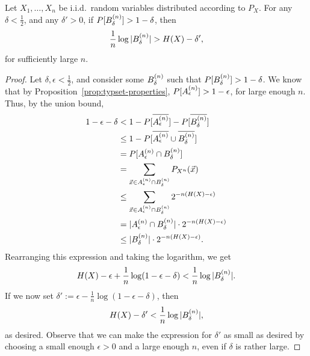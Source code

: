 \begin{theorem}
Let $X_1, \ldots, X_n$ be i.i.d.\ random variables distributed according to $P_X$. For any $\delta < \frac{1}{2}$, and any $\delta' > 0$, if $P[B_{\delta}^{(n)}] > 1 - \delta$, then
\[
\frac{1}{n} \log |B_{\delta}^{(n)}| > H(X) - \delta',
\]
for sufficiently large $n$.
\end{theorem}
\begin{proof}
Let $\delta,\epsilon < \frac{1}{2}$, and consider some $B_{\delta}^{(n)}$ such that $P[B_{\delta}^{(n)}] > 1 - \delta$. We know that by Proposition~\ref{prop:typset-properties}, $P[A_{\epsilon}^{(n)}] > 1 - \epsilon$, for large enough $n$. Thus, by the union bound,
\begin{align}
1 - \epsilon - \delta &< 1 - P[\overline{A_{\epsilon}^{(n)}}] - P[\overline{B_{\delta}^{(n)}}]\nonumber\\
&\leq 1-P[\overline{A_{\epsilon}^{(n)}} \cup \overline{B_{\delta}^{(n)}}]\nonumber\\
&= P[A_{\epsilon}^{(n)} \cap B_{\delta}^{(n)}]\nonumber\\
&= \sum_{\vec{x} \in A_{\epsilon}^{(n)} \cap B_{\delta}^{(n)}} P_{X^n}(\vec{x})\nonumber\\
&\leq \sum_{\vec{x} \in A_{\epsilon}^{(n)} \cap B_{\delta}^{(n)}} 2^{-n(H(X) - \epsilon)}\nonumber\\
&= |A_{\epsilon}^{(n)} \cap B_{\delta}^{(n)}| \cdot 2^{-n(H(X) - \epsilon)}\nonumber\\
&\leq |B_{\delta}^{(n)}| \cdot 2^{-n(H(X) - \epsilon)}.
\end{align}
Rearranging this expression and taking the logarithm, we get
\begin{align}
H(X) - \epsilon + \frac{1}{n} \log (1 - \epsilon - \delta) < \frac{1}{n} \log |B_{\delta}^{(n)}|.
\end{align}
If we now set $\delta' := \epsilon - \frac{1}{n} \log (1 - \epsilon - \delta)$, then
\begin{align}
H(X) - \delta' < \frac{1}{n} \log |B_{\delta}^{(n)}|,
\end{align}
as desired. Observe that we can make the expression for $\delta'$ as small as desired by choosing a small enough $\epsilon>0$ and a large enough $n$, even if $\delta$ is rather large.
\end{proof}



